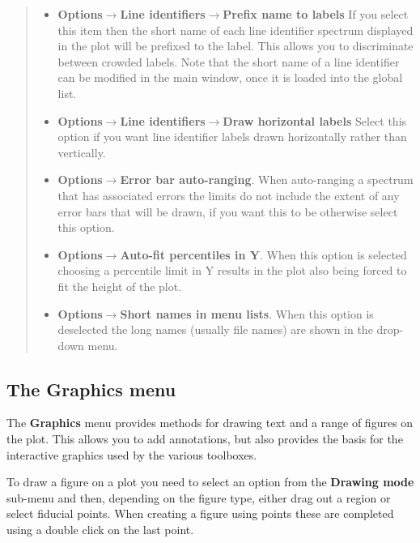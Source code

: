 \documentclass[twoside,11pt]{article}
\newcommand{\latexhtml}[2]{#1}
\renewcommand{\_}{\texttt{\symbol{95}}}
\newcommand{\menuitem}[1]{\textbf{#1}}
\newcommand{\submenuitem}[2]{\latexhtml{\textbf{#1$\rightarrow$#2}}{\textbf{#1->#2}}}
\newcommand{\subsubmenuitem}[3]{\latexhtml{\textbf{#1$\rightarrow$#2$\rightarrow$#3}}{\textbf{#1->#2->#3}}}
\begin{document}
\begin{quote}
\begin{itemize}
  \item \subsubmenuitem{Options}{Line identifiers}{Prefix name to labels}
  If you select this item then the short name of each line identifier spectrum
  displayed in the plot will be prefixed to the label. This allows you to
  discriminate between crowded labels. Note that the short name of a line
  identifier can be modified in the main window, once it is loaded into the
  global list.

  \item \subsubmenuitem{Options}{Line identifiers}{Draw horizontal labels}
  Select this option if you want line identifier labels drawn horizontally
  rather than vertically.

  \item \submenuitem{Options}{Error bar auto-ranging}. When auto-ranging a
  spectrum that has associated errors the limits do not include the extent of
  any error bars that will be drawn, if you want this to be otherwise select
  this option.

  \item \submenuitem{Options}{Auto-fit percentiles in Y}. When this option is
  selected choosing a percentile limit in Y results in the plot also being
  forced to fit the height of the plot.

  \item \submenuitem{Options}{Short names in menu lists}. When this option is
  deselected the long names (usually file names) are shown in the
  \label{Displaying:} drop-down menu.

 \end{itemize}
\end{quote}

\subsection{The Graphics menu}

The \menuitem{Graphics} menu provides methods for drawing text and a range of
figures on the plot. This allows you to add annotations, but also provides the
basis for the interactive graphics used by the various toolboxes.

To draw a figure on a plot you need to select an option from the
\menuitem{Drawing mode} sub-menu and then, depending on the figure type, either
drag out a region or select fiducial points. When creating a figure using
points these are completed using a double click on the last point.
\end{document}

